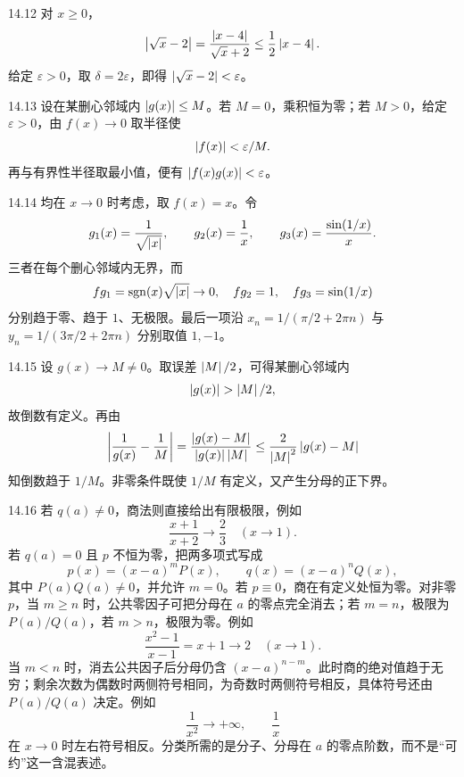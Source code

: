 \begin{solution}{14.12}
对 \(x\ge0\)，
\[
 \left|\sqrt x-2\right|
 =\frac{\left|x-4\right|}{\sqrt x+2}
 \le\frac12\left|x-4\right|.
\]
给定 \(\varepsilon>0\)，取 \(\delta=2\varepsilon\)，即得 \(\left|\sqrt x-2\right|<\varepsilon\)。
\end{solution}

\begin{solution}{14.13}
设在某删心邻域内 \(\left|g(x)\right|\le M\)。若 \(M=0\)，乘积恒为零；若 \(M>0\)，给定 \(\varepsilon>0\)，由 \(f(x)\to0\) 取半径使
\[
 \left|f(x)\right|<\varepsilon/M.
\]
再与有界性半径取最小值，便有 \(\left|f(x)g(x)\right|<\varepsilon\)。
\end{solution}

\begin{solution}{14.14}
均在 \(x\to0\) 时考虑，取 \(f(x)=x\)。令
\[
 g_1(x)=\frac1{\sqrt{\left|x\right|}},\qquad
 g_2(x)=\frac1x,\qquad
 g_3(x)=\frac{\sin(1/x)}x.
\]
三者在每个删心邻域内无界，而
\[
 f g_1=\operatorname{sgn}(x)\sqrt{\left|x\right|}\to0,\quad
 f g_2=1,\quad
 f g_3=\sin(1/x)
\]
分别趋于零、趋于 \(1\)、无极限。最后一项沿 \(x_n=1/(\pi/2+2\pi n)\) 与 \(y_n=1/(3\pi/2+2\pi n)\) 分别取值 \(1,-1\)。
\end{solution}

\begin{solution}{14.15}
设 \(g(x)\to M\ne0\)。取误差 \(\left|M\right|/2\)，可得某删心邻域内
\[
 \abs{g(x)}>\abs M/2,
\]
故倒数有定义。再由
\[
 \left|\frac1{g(x)}-\frac1M\right|
 =\frac{\left|g(x)-M\right|}{\left|g(x)\right|\left|M\right|}
 \le\frac2{\left|M\right|^2}\left|g(x)-M\right|
\]
知倒数趋于 \(1/M\)。非零条件既使 \(1/M\) 有定义，又产生分母的正下界。
\end{solution}

\begin{solution}{14.16}
若 \(q(a)\ne0\)，商法则直接给出有限极限，例如
\[
 \frac{x+1}{x+2}\longrightarrow\frac23\quad(x\to1).
\]
若 \(q(a)=0\) 且 \(p\) 不恒为零，把两多项式写成
\[
 p(x)=(x-a)^mP(x),\qquad q(x)=(x-a)^nQ(x),
\]
其中 \(P(a)Q(a)\ne0\)，并允许 \(m=0\)。若 \(p\equiv0\)，商在有定义处恒为零。对非零 \(p\)，当 \(m\ge n\) 时，公共零因子可把分母在 \(a\) 的零点完全消去；若 \(m=n\)，极限为 \(P(a)/Q(a)\)，若 \(m>n\)，极限为零。例如
\[
 \frac{x^2-1}{x-1}=x+1\to2\quad(x\to1).
\]
当 \(m<n\) 时，消去公共因子后分母仍含 \((x-a)^{n-m}\)。此时商的绝对值趋于无穷；剩余次数为偶数时两侧符号相同，为奇数时两侧符号相反，具体符号还由 \(P(a)/Q(a)\) 决定。例如
\[
 \frac1{x^2}\to+\infty,\qquad \frac1x
\]
在 \(x\to0\) 时左右符号相反。分类所需的是分子、分母在 \(a\) 的零点阶数，而不是“可约”这一含混表述。
\end{solution}

